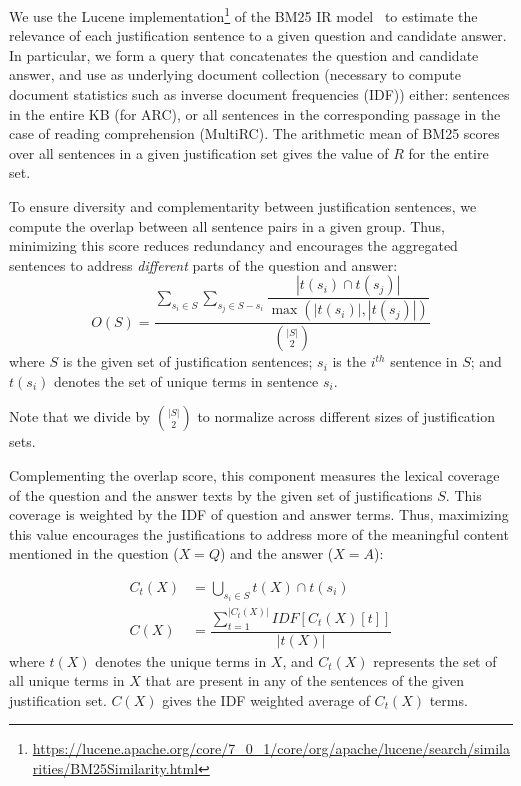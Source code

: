 \begin{description}[topsep=0.2em, itemsep=0.1em, wide, labelwidth=!, labelindent=0pt]

\item[Relevance (R)] We use the Lucene implementation\footnote{\url{https://lucene.apache.org/core/7_0_1/core/org/apache/lucene/search/similarities/BM25Similarity.html}} of the BM25 IR model~\cite{BM25} to estimate the relevance of each justification sentence to a given question and candidate answer. In particular, we form a query that concatenates the question and candidate answer, and use as underlying document collection (necessary to compute document statistics such as inverse document frequencies (IDF)) either: sentences in the entire KB (for ARC), or all sentences in the corresponding passage in the case of reading comprehension (MultiRC). The arithmetic mean of BM25 scores over all sentences in a given justification set gives the value of $R$ for the entire set.

\item[Overlap (O)] To ensure diversity and complementarity between justification sentences, we compute the overlap between all sentence pairs in a given group. Thus, minimizing this score reduces redundancy and encourages the aggregated sentences to address {\em different} parts of the question and answer:
\begin{equation}
O(S) = \dfrac{\displaystyle\sum_{s_i \in S} \sum_{s_j \in S - s_i} \dfrac{|t(s_i) \cap t(s_j)|}{\max (|t(s_i)|, |t(s_j)|)}} { {|S| \choose 2}}
\end{equation}
where $S$ is the given set of justification sentences; $s_i$ is the $i^{th}$ sentence in $S$; and $t(s_i)$ denotes the set of unique terms in sentence $s_i$.

Note that we divide by $|S| \choose 2$ to normalize across different sizes of justification sets. 

\item[Coverage (C)] Complementing the overlap score, this component measures the lexical coverage of the question and the answer texts by the given set of justifications $S$. This coverage is weighted by the IDF of question and answer terms. Thus, maximizing this value encourages the justifications to address more of the meaningful content mentioned in the question ($X=Q$) and the answer ($X=A$):

\begin{align}
    C_t(X) &= \displaystyle\bigcup_{s_i \in S} t(X) \cap t(s_i)\\
    C(X) &= \dfrac{\sum_{t=1}^{|C_t(X)|} IDF[C_t(X)[t]]}{|t(X)|}
    \label{Coverage_IDF}
\end{align}
where $t(X)$ denotes the unique terms in $X$, and $C_t(X)$ represents the set of all unique terms in $X$ that are present in any of the sentences of the given justification set. $C(X)$ gives the IDF weighted average of $C_t(X)$ terms.

\end{description}

